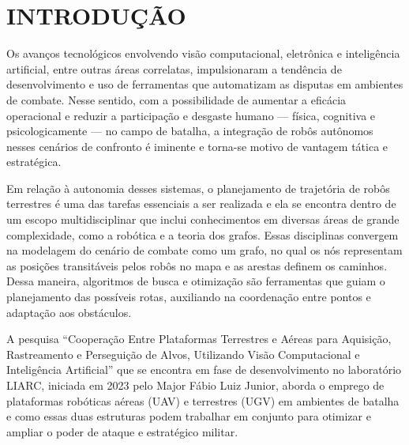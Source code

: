 \documentclass[
    12pt,
    openright,
    oneside,
    a4paper,
    english,
    brazil
]{abntex2}
\begin{document}
\tableofcontents*
\cleardoublepage

\textual

\chapter{INTRODUÇÃO}

Os avanços tecnológicos envolvendo visão computacional, eletrônica e inteligência artificial, entre outras áreas correlatas, impulsionaram a tendência de desenvolvimento e uso de ferramentas que automatizam as disputas em ambientes de combate. Nesse sentido, com a possibilidade de aumentar a eficácia operacional e reduzir a participação e desgaste humano --- física, cognitiva e psicologicamente --- no campo de batalha, a integração de robôs autônomos nesses cenários de confronto é iminente e torna-se motivo de vantagem tática e estratégica.

Em relação à autonomia desses sistemas, o planejamento de trajetória de robôs terrestres é uma das tarefas essenciais a ser realizada e ela se encontra dentro de um escopo multidisciplinar que inclui conhecimentos em diversas áreas de grande complexidade, como a robótica e a teoria dos grafos. Essas disciplinas convergem na modelagem do cenário de combate como um grafo, no qual os nós representam as posições transitáveis pelos robôs no mapa e as arestas definem os caminhos. Dessa maneira, algoritmos de busca e otimização são ferramentas que guiam o planejamento das possíveis rotas, auxiliando na coordenação entre pontos e adaptação aos obstáculos.

A pesquisa ``Cooperação Entre Plataformas Terrestres e Aéreas para Aquisição, Rastreamento e Perseguição de Alvos, Utilizando Visão Computacional e Inteligência Artificial'' \cite{junior2024} que se encontra em fase de desenvolvimento no laboratório LIARC, iniciada em 2023 pelo Major Fábio Luiz Junior, aborda o emprego de plataformas robóticas aéreas (UAV) e terrestres (UGV) em ambientes de batalha e como essas duas estruturas podem trabalhar em conjunto para otimizar e ampliar o poder de ataque e estratégico militar.
\end{document}
